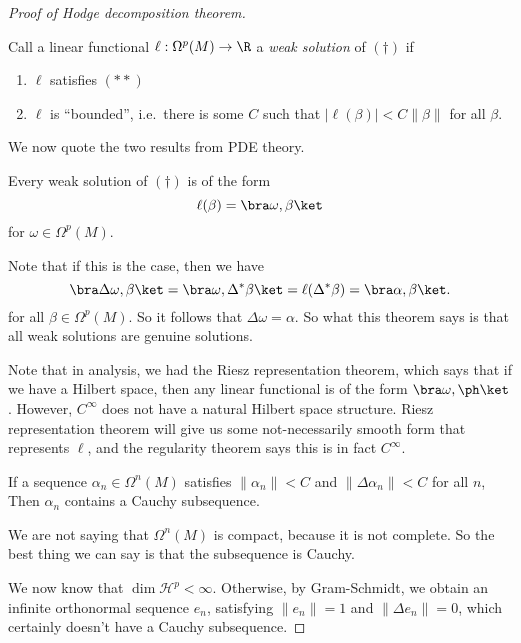 \documentclass[a4paper]{article}
\begin{document}
\begin{proof}[Proof of Hodge decomposition theorem]
  \begin{defi}
    Call a linear functional $\ell: \Omega^p(M) \to \R$ a \emph{weak solution} of $(\dagger)$ if
    \begin{enumerate}
      \item $\ell$ satisfies $(**)$
      \item $\ell$ is ``bounded'', i.e.\ there is some $C$ such that $|\ell (\beta)| < C \|\beta\|$ for all $\beta$.
    \end{enumerate}
  \end{defi}
  We now quote the two results from PDE theory.
  \begin{thm}
    Every weak solution of $(\dagger)$ is of the form
    \[
      \ell(\beta) = \bra \omega, \beta\ket
    \]
    for $\omega \in \Omega^p(M)$.
  \end{thm}
  Note that if this is the case, then we have
  \[
    \bra \Delta\omega, \beta\ket = \bra \omega, \Delta^* \beta\ket = \ell(\Delta^* \beta) = \bra \alpha, \beta\ket.
  \]
  for all $\beta \in \Omega^p(M)$. So it follows that $\Delta \omega = \alpha$. So what this theorem says is that all weak solutions are genuine solutions.

  Note that in analysis, we had the Riesz representation theorem, which says that if we have a Hilbert space, then any linear functional is of the form $\bra \omega, \ph\ket$. However, $C^\infty$ does not have a natural Hilbert space structure. Riesz representation theorem will give us some not-necessarily smooth form that represents $\ell$, and the regularity theorem says this is in fact $C^\infty$.

  \begin{thm}
    If a sequence $\alpha_n \in \Omega^n(M)$ satisfies $\|\alpha_n\| < C$ and $\|\Delta \alpha_n\| < C$ for all $n$, Then $\alpha_n$ contains a Cauchy subsequence.
  \end{thm}
  We are not saying that $\Omega^n(M)$ is compact, because it is not complete. So the best thing we can say is that the subsequence is Cauchy.

  We now know that $\dim \mathcal{H}^p < \infty$. Otherwise, by Gram-Schmidt, we obtain an infinite orthonormal sequence $e_n$, satisfying $\|e_n\| = 1$ and $\|\Delta e_n\| = 0$, which certainly doesn't have a Cauchy subsequence.


\end{proof}
\end{document}
